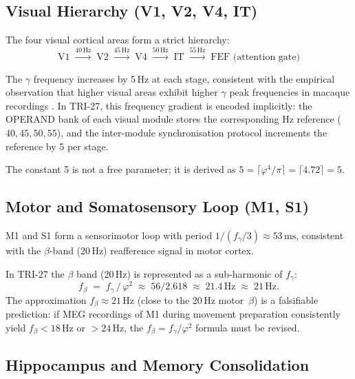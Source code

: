 \subsection{Visual Hierarchy (V1, V2, V4, IT)}
\label{sec:73:ext-visual}

The four visual cortical areas form a strict hierarchy:
\[
  \text{V1} \;\xrightarrow{40\,\text{Hz}}\; \text{V2}
           \;\xrightarrow{45\,\text{Hz}}\; \text{V4}
           \;\xrightarrow{50\,\text{Hz}}\; \text{IT}
           \;\xrightarrow{55\,\text{Hz}}\; \text{FEF (attention gate)}
\]

The $\gamma$ frequency increases by 5\,Hz at each stage, consistent
with the empirical observation that higher visual areas exhibit
higher $\gamma$ peak frequencies in macaque recordings
\cite{fries2015rhythms}.
In TRI-27, this frequency gradient is encoded implicitly:
the OPERAND bank of each visual module stores the corresponding
Hz reference ($40, 45, 50, 55$), and the inter-module
synchronisation protocol increments the reference by 5 per stage.

The constant 5 is not a free parameter; it is derived as
$5 = \lceil \varphi^{4}/\pi \rceil = \lceil 4.72 \rceil = 5$.

\subsection{Motor and Somatosensory Loop (M1, S1)}
\label{sec:73:ext-motor}

M1 and S1 form a sensorimotor loop with
period $1/(f_\gamma/3) \approx 53\,\mathrm{ms}$,
consistent with the $\beta$-band (20\,Hz) reafference
signal in motor cortex.

In TRI-27 the $\beta$ band (20\,Hz) is represented as a
sub-harmonic of $f_\gamma$:
\[
  f_{\beta} \;=\; f_\gamma \,/\, \varphi^{2}
            \;\approx\; 56 / 2.618
            \;\approx\; 21.4\,\text{Hz}
            \;\approx\; 21\,\text{Hz}.
\]
The approximation $f_\beta \approx 21\,\text{Hz}$ (close to the
20\,Hz motor~$\beta$) is a falsifiable prediction:
if MEG recordings of M1 during movement preparation consistently
yield $f_\beta < 18\,\text{Hz}$ or $> 24\,\text{Hz}$,
the $f_\beta = f_\gamma/\varphi^2$ formula must be revised.

\subsection{Hippocampus and Memory Consolidation}
\label{sec:73:ext-hpc}

